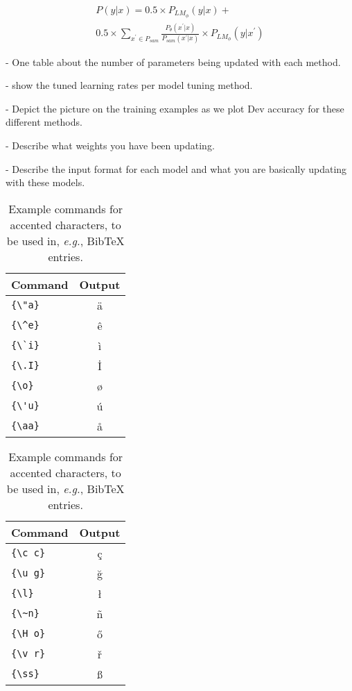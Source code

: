 \documentclass[11pt]{article}
\begin{document}
\begin{multline}
P(y|x) = 0.5 \times P_{LM_{\phi}}(y|x) + \\
0.5 \times \sum_{x^{'} \in P_{sam}} \frac{P_{\theta}(x^{'} | x)}{P_{sam}(x^{'} | x)} \times P_{LM_{\phi}}(y | x^{'})
\end{multline}

- One table about the number of parameters being updated with each method.

- show the tuned learning rates per model tuning method.

- Depict the picture on the training examples as we plot Dev accuracy for these different methods.


- Describe what weights you have been updating.

- Describe the input format for each model and what you are basically updating with these models.


\begin{table}
\centering
\begin{tabular}{lc}
\hline
\textbf{Command} & \textbf{Output}\\
\hline
\verb|{\"a}| & {\"a} \\
\verb|{\^e}| & {\^e} \\
\verb|{\`i}| & {\`i} \\ 
\verb|{\.I}| & {\.I} \\ 
\verb|{\o}| & {\o} \\
\verb|{\'u}| & {\'u}  \\ 
\verb|{\aa}| & {\aa}  \\\hline
\end{tabular}
\begin{tabular}{lc}
\hline
\textbf{Command} & \textbf{Output}\\
\hline
\verb|{\c c}| & {\c c} \\ 
\verb|{\u g}| & {\u g} \\ 
\verb|{\l}| & {\l} \\ 
\verb|{\~n}| & {\~n} \\ 
\verb|{\H o}| & {\H o} \\ 
\verb|{\v r}| & {\v r} \\ 
\verb|{\ss}| & {\ss} \\
\hline
\end{tabular}
\caption{Example commands for accented characters, to be used in, \emph{e.g.}, Bib\TeX{} entries.}
\label{tab:accents}
\end{table}
\end{document}
